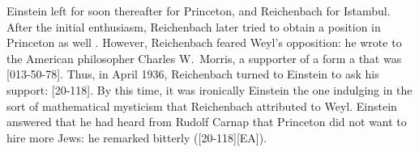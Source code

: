 \documentclass[draft]{article}
\begin{document}

Einstein left for soon thereafter for Princeton, and Reichenbach for Istambul. After the initial enthusiasm, Reichenbach later tried to obtain a position in Princeton as well \citep{Verhaegh2020a}. However, Reichenbach feared Weyl's opposition:  he wrote to the American philosopher Charles W.\ Morris, a supporter of a form a  that was  [013-50-78].  Thus, in April 1936, Reichenbach turned to Einstein to ask his support:  [20-118]. By this time, it was ironically Einstein the one indulging in the sort of mathematical mysticism that Reichenbach attributed to Weyl. Einstein answered that he had heard from Rudolf Carnap that Princeton did not want to hire more Jews:  he remarked bitterly ([20-118][EA]).
\end{document}
